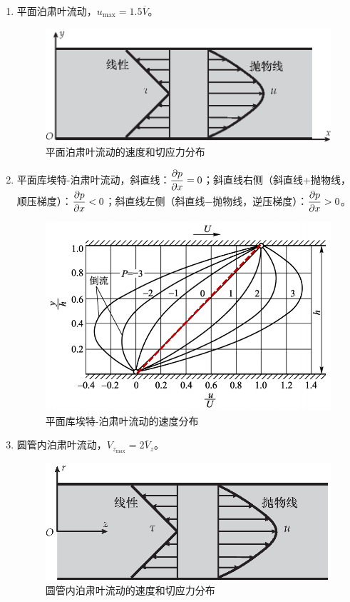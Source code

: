 \begin{enumerate}
	\item 平面泊肃叶流动，$u_{\text{max}} = 1.5 \overline{V}$。
	\begin{figure}[H]
		\centering
		\includegraphics[scale=0.6]{figures/平面泊肃叶.eps}
		\caption{平面泊肃叶流动的速度和切应力分布}
	\end{figure}
	\item 平面库埃特-泊肃叶流动，斜直线：$\displaystyle \pdv{p}{x} = 0$；斜直线右侧（斜直线+抛物线，顺压梯度）：$\displaystyle \pdv{p}{x} < 0$；斜直线左侧（斜直线$-$抛物线，逆压梯度）：$\displaystyle \pdv{p}{x} > 0$。
	\begin{figure}[H]
		\centering
		\includegraphics[scale=0.35]{figures/平面库埃特.png}
		\caption{平面库埃特-泊肃叶流动的速度分布}
	\end{figure}
	\item 圆管内泊肃叶流动，$V_{z_{\text{max}}} = 2 \overline{V}_z$。
	\begin{figure}[H]
		\centering
		\includegraphics[scale=0.6]{figures/圆管泊肃叶.eps}
		\caption{圆管内泊肃叶流动的速度和切应力分布}
	\end{figure}
\end{enumerate}

